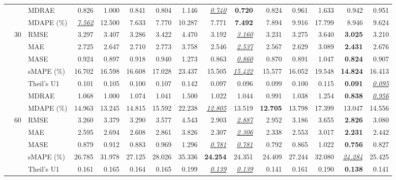 \begin{table}[!htbp]
{\begin{tabular}{lllrrrrrrrrrrrr}
 &  & MDRAE & 0.826 & 1.000 & 0.841 & 0.804 & 1.146 & \underline{\textit{0.740}} & \textbf{0.720} & 0.824 & 0.961 & 1.633 & 0.942 & 0.951 \\
 &  & MDAPE (\%) & \underline{\textit{7.562}} & 12.500 & 7.633 & 7.770 & 10.287 & 7.771 & \textbf{7.492} & 7.894 & 9.916 & 17.799 & 8.946 & 9.624 \\
\cmidrule(lr){2-15}
 & 30 & RMSE & 3.297 & 3.407 & 3.286 & 3.422 & 4.470 & 3.192 & \underline{\textit{3.160}} & 3.231 & 3.275 & 3.640 & \textbf{3.025} & 3.210 \\
 &  & MAE & 2.725 & 2.647 & 2.710 & 2.773 & 3.758 & 2.546 & \underline{\textit{2.537}} & 2.567 & 2.629 & 3.089 & \textbf{2.431} & 2.676 \\
 &  & MASE & 0.924 & 0.897 & 0.918 & 0.940 & 1.273 & 0.863 & \underline{\textit{0.860}} & 0.870 & 0.891 & 1.047 & \textbf{0.824} & 0.907 \\
 &  & sMAPE (\%) & 16.702 & 16.598 & 16.608 & 17.028 & 23.437 & 15.505 & \underline{\textit{15.422}} & 15.577 & 16.052 & 19.548 & \textbf{14.824} & 16.413 \\
 &  & Theil's U1 & 0.101 & 0.105 & 0.100 & 0.107 & 0.142 & 0.097 & 0.096 & 0.099 & 0.100 & 0.115 & \textbf{0.091} & \underline{\textit{0.095}} \\
 &  & MDRAE & 1.068 & 1.000 & 1.074 & 1.041 & 1.500 & 1.022 & 1.044 & 0.991 & 1.038 & 1.254 & \textbf{0.838} & \underline{\textit{0.956}} \\
 &  & MDAPE (\%) & 14.963 & 13.245 & 14.815 & 15.592 & 22.238 & \underline{\textit{12.805}} & 13.519 & \textbf{12.705} & 13.798 & 17.399 & 13.047 & 14.556 \\
\cmidrule(lr){2-15}
 & 60 & RMSE & 3.260 & 3.379 & 3.290 & 3.577 & 4.543 & 2.903 & \underline{\textit{2.887}} & 2.952 & 3.186 & 3.655 & \textbf{2.826} & 3.080 \\
 &  & MAE & 2.595 & 2.694 & 2.608 & 2.861 & 3.826 & 2.307 & \underline{\textit{2.306}} & 2.338 & 2.553 & 3.017 & \textbf{2.231} & 2.442 \\
 &  & MASE & 0.879 & 0.912 & 0.883 & 0.969 & 1.296 & \underline{\textit{0.781}} & \underline{\textit{0.781}} & 0.792 & 0.865 & 1.022 & \textbf{0.756} & 0.827 \\
 &  & sMAPE (\%) & 26.785 & 31.978 & 27.125 & 28.026 & 35.336 & \textbf{24.254} & 24.351 & 24.409 & 27.244 & 32.080 & \underline{\textit{24.284}} & 25.425 \\
 &  & Theil's U1 & 0.161 & 0.165 & 0.164 & 0.165 & 0.199 & \underline{\textit{0.139}} & \underline{\textit{0.139}} & 0.141 & 0.161 & 0.190 & \textbf{0.138} & 0.141 \\

\end{tabular}}
\end{table}
